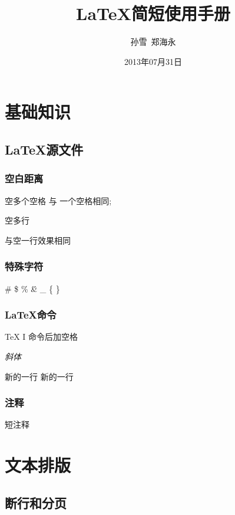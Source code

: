\documentclass[a4paper,12pt]{article}
\title{\LaTeX{}简短使用手册} %
\author{孙雪\ 郑海永}  %
\date{2013年07月31日} %
\begin{document}
\maketitle
\tableofcontents %

\section{基础知识}

\subsection{\LaTeX{}源文件}

\subsubsection{空白距离}

空多个空格 与   一个空格相同;%

空多行


与空一行效果相同  %

\subsubsection{特殊字符}

\# \$ \% \^ \& \_ \{ \} %

\subsubsection{\LaTeX{}命令}

\TeX{} I 命令后加空格 %

\textsl{斜体} %

新的一行 \newline 新的一行

\subsubsection{注释}

短注释 %
\begin{comment}
balala
\end{comment}   %

\section{文本排版}

\subsection{断行和分页}
\end{document}
